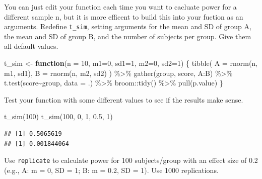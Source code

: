 \documentclass[
  oneside]{book}
\newenvironment{Shaded}{\begin{snugshade}}{\end{snugshade}}
\newcommand{\AttributeTok}[1]{\textcolor[rgb]{0.77,0.63,0.00}{#1}}
\newcommand{\ControlFlowTok}[1]{\textcolor[rgb]{0.13,0.29,0.53}{\textbf{#1}}}
\newcommand{\DecValTok}[1]{\textcolor[rgb]{0.00,0.00,0.81}{#1}}
\newcommand{\FloatTok}[1]{\textcolor[rgb]{0.00,0.00,0.81}{#1}}
\newcommand{\FunctionTok}[1]{\textcolor[rgb]{0.00,0.00,0.00}{#1}}
\newcommand{\NormalTok}[1]{#1}
\newcommand{\OtherTok}[1]{\textcolor[rgb]{0.56,0.35,0.01}{#1}}
\newcommand{\SpecialCharTok}[1]{\textcolor[rgb]{0.00,0.00,0.00}{#1}}
\begin{document}
You can just edit your function each time you want to cacluate power for a different sample n, but it is more efficent to build this into your fuction as an arguments. Redefine \texttt{t\_sim}, setting arguments for the mean and SD of group A, the mean and SD of group B, and the number of subjects per group. Give them all default values.

\begin{Shaded}
\begin{Highlighting}[]
\NormalTok{t\_sim }\OtherTok{\textless{}{-}} \ControlFlowTok{function}\NormalTok{(}\AttributeTok{n =} \DecValTok{10}\NormalTok{, }\AttributeTok{m1=}\DecValTok{0}\NormalTok{, }\AttributeTok{sd1=}\DecValTok{1}\NormalTok{, }\AttributeTok{m2=}\DecValTok{0}\NormalTok{, }\AttributeTok{sd2=}\DecValTok{1}\NormalTok{) \{}
  \FunctionTok{tibble}\NormalTok{(}
    \AttributeTok{A =} \FunctionTok{rnorm}\NormalTok{(n, m1, sd1),}
    \AttributeTok{B =} \FunctionTok{rnorm}\NormalTok{(n, m2, sd2)}
\NormalTok{  ) }\SpecialCharTok{\%\textgreater{}\%}
    \FunctionTok{gather}\NormalTok{(group, score, A}\SpecialCharTok{:}\NormalTok{B) }\SpecialCharTok{\%\textgreater{}\%}
    \FunctionTok{t.test}\NormalTok{(score}\SpecialCharTok{\textasciitilde{}}\NormalTok{group, }\AttributeTok{data =}\NormalTok{ .) }\SpecialCharTok{\%\textgreater{}\%}
\NormalTok{    broom}\SpecialCharTok{::}\FunctionTok{tidy}\NormalTok{() }\SpecialCharTok{\%\textgreater{}\%}
    \FunctionTok{pull}\NormalTok{(p.value) }
\NormalTok{\}}
\end{Highlighting}
\end{Shaded}

Test your function with some different values to see if the results make sense.

\begin{Shaded}
\begin{Highlighting}[]
\FunctionTok{t\_sim}\NormalTok{(}\DecValTok{100}\NormalTok{)}
\FunctionTok{t\_sim}\NormalTok{(}\DecValTok{100}\NormalTok{, }\DecValTok{0}\NormalTok{, }\DecValTok{1}\NormalTok{, }\FloatTok{0.5}\NormalTok{, }\DecValTok{1}\NormalTok{)}
\end{Highlighting}
\end{Shaded}

\begin{verbatim}
## [1] 0.5065619
## [1] 0.001844064
\end{verbatim}

Use \texttt{replicate} to calculate power for 100 subjects/group with an effect size of 0.2 (e.g., A: m = 0, SD = 1; B: m = 0.2, SD = 1). Use 1000 replications.
\end{document}
